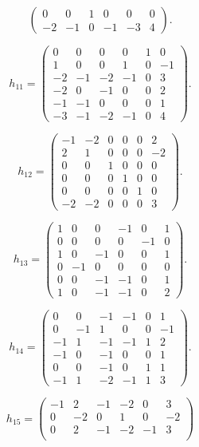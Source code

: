 \begin{description}
\[\begin{pmatrix}
0 & 0 & 1 & 0 & 0 & 0 \\
-2 & -1 & 0 & -1 & -3 & 4
\end{pmatrix}.
\]
\item[$h_{11}$] 
\[
h_{11}=\begin{pmatrix}
0 & 0 & 0 & 0 & 1 & 0 \\
1 & 0 & 0 & 1 & 0 & -1 \\
-2 & -1 & -2 & -1 & 0 & 3 \\
-2 & 0 & -1 & 0 & 0 & 2 \\
-1 & -1 & 0 & 0 & 0 & 1 \\
-3 & -1 & -2 & -1 & 0 & 4
\end{pmatrix}.
\]
\item[$h_{12}$] 
\[
h_{12}=\begin{pmatrix}
-1 & -2 & 0 & 0 & 0 & 2 \\
2 & 1 & 0 & 0 & 0 & -2 \\
0 & 0 & 1 & 0 & 0 & 0 \\
0 & 0 & 0 & 1 & 0 & 0 \\
0 & 0 & 0 & 0 & 1 & 0 \\
-2 & -2 & 0 & 0 & 0 & 3
\end{pmatrix}.
\]
\item[$h_{13}$] 
\[
h_{13}=\begin{pmatrix}
1 & 0 & 0 & -1 & 0 & 1 \\
0 & 0 & 0 & 0 & -1 & 0 \\
1 & 0 & -1 & 0 & 0 & 1 \\
0 & -1 & 0 & 0 & 0 & 0 \\
0 & 0 & -1 & -1 & 0 & 1 \\
1 & 0 & -1 & -1 & 0 & 2
\end{pmatrix}.
\]
\item[$h_{14}$] 
\[
h_{14}=\begin{pmatrix}
0 & 0 & -1 & -1 & 0 & 1 \\
0 & -1 & 1 & 0 & 0 & -1 \\
-1 & 1 & -1 & -1 & 1 & 2 \\
-1 & 0 & -1 & 0 & 0 & 1 \\
0 & 0 & -1 & 0 & 1 & 1 \\
-1 & 1 & -2 & -1 & 1 & 3
\end{pmatrix}.
\]
\item[$h_{15}$] 
\[
h_{15}=\begin{pmatrix}
-1 & 2 & -1 & -2 & 0 & 3 \\
0 & -2 & 0 & 1 & 0 & -2 \\
0 & 2 & -1 & -2 & -1 & 3 \\

\end{pmatrix}\]
\end{description}
